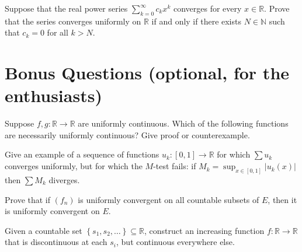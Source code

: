 \documentclass[answers]{exam}
\begin{document}
\begin{questions}



\question%
Suppose that the real power series $\sum_{k=0}^{\infty} c_{k} x^{k}$ converges for every $x \in \mathbb{R}$. Prove that the series converges uniformly on $\mathbb{R}$ if and only if there exists $N \in \mathbb{N}$ such that $c_{k}=0$ for all $k>N$.



\section*{Bonus Questions (optional, for the enthusiasts)}

\question%
Suppose $f, g: \mathbb{R} \to \mathbb{R}$ are uniformly continuous. Which of the following functions are necessarily uniformly continuous? Give proof or counterexample.



\question%
Give an example of a sequence of functions $u_{k}:[0,1] \to \mathbb{R}$ for which $\sum u_{k}$ converges uniformly, but for which the $M$-test fails: if $M_{k}=\sup _{x \in[0,1]}\left|u_{k}(x)\right|$ then $\sum M_{k}$ diverges.



\question%
Prove that if $\left(f_{n}\right)$ is uniformly convergent on all countable subsets of $E$, then it is uniformly convergent on $E$.



\question%
Given a countable set $\left\{s_{1}, s_{2}, \ldots\right\} \subseteq \mathbb{R}$, construct an increasing function $f: \mathbb{R} \to \mathbb{R}$ that is discontinuous at each $s_{i}$, but continuous everywhere else.

\end{questions}
\end{document}
